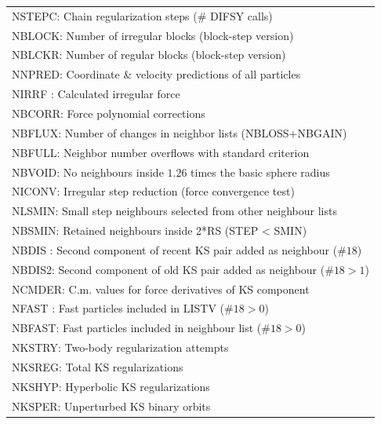 \begin{longtable}{||p{0.42in}|p{0.25in}|p{0.6in}|p{0.6in}|p{0.4in}|p{2.3in}||}
\multicolumn{6}{|p{5.4in}|}{ NSTEPC: Chain regularization steps (\# DIFSY calls)}\\
\multicolumn{6}{|p{5.4in}|}{ NBLOCK: Number of irregular blocks (block-step version)}\\
\multicolumn{6}{|p{5.4in}|}{ NBLCKR: Number of regular blocks (block-step version)}\\
\multicolumn{6}{|p{5.4in}|}{ NNPRED: Coordinate \& velocity predictions of all particles }\\
\multicolumn{6}{|p{5.4in}|}{ NIRRF : Calculated irregular force}\\
\multicolumn{6}{|p{5.4in}|}{ NBCORR: Force polynomial corrections}\\
\multicolumn{6}{|p{5.4in}|}{ NBFLUX: Number of changes in neighbor lists (NBLOSS+NBGAIN)}\\
\multicolumn{6}{|p{5.4in}|}{ NBFULL: Neighbor number overflows with standard criterion}\\
\multicolumn{6}{|p{5.4in}|}{ NBVOID: No neighbours inside $1.26$ times the basic sphere radius}\\
\multicolumn{6}{|p{5.4in}|}{ NICONV: Irregular step reduction (force convergence test)}\\
\multicolumn{6}{|p{5.4in}|}{ NLSMIN: Small step neighbours selected from other neighbour lists}\\
\multicolumn{6}{|p{5.4in}|}{ NBSMIN: Retained neighbours inside 2*RS (STEP < SMIN)}\\
\multicolumn{6}{|p{5.4in}|}{ NBDIS : Second component of recent KS pair added as neighbour ($\#18$)}\\
\multicolumn{6}{|p{5.4in}|}{ NBDIS2: Second component of old KS pair added as neighbour ($\#18>1$)}\\
\multicolumn{6}{|p{5.4in}|}{ NCMDER: C.m. values for force derivatives of KS component}\\
\multicolumn{6}{|p{5.4in}|}{ NFAST : Fast particles included in LISTV ($\#18>0$)}\\
\multicolumn{6}{|p{5.4in}|}{ NBFAST: Fast particles included in neighbour list ($\#18>0$)}\\
\multicolumn{6}{|p{5.4in}|}{ NKSTRY: Two-body regularization attempts}\\
\multicolumn{6}{|p{5.4in}|}{ NKSREG: Total KS regularizations}\\
\multicolumn{6}{|p{5.4in}|}{ NKSHYP: Hyperbolic KS regularizations}\\
\multicolumn{6}{|p{5.4in}|}{ NKSPER: Unperturbed KS binary orbits}\\

\end{longtable}
